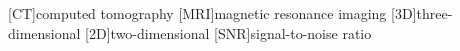 \begin{acronym}
    [CT]{computed tomography}
    [MRI]{magnetic resonance imaging}
    [3D]{three-dimensional}
    [2D]{two-dimensional}
    [SNR]{signal-to-noise ratio}
\end{acronym}